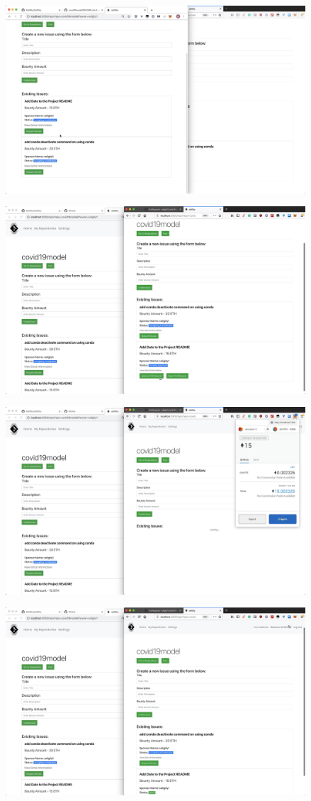 \documentclass[12pt]{article}
\renewcommand{\_}{\kern-1.5pt\textunderscore\kern-1.5pt}
\begin{document}
\begin{enumerate}
	      \includegraphics[height=7cm]{graphs/39. issue_info_updated}

	      \includegraphics[height=7cm]{graphs/40. alice_approve_pull_request}

	      \includegraphics[height=7cm]{graphs/41. alice_metamask_confirm}

	      \includegraphics[height=7cm]{graphs/42. alice_balance_updated}


\end{enumerate}
\end{document}
